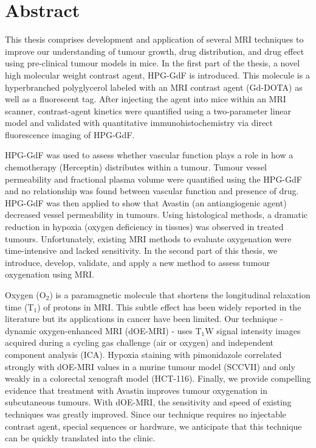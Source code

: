 
\chapter{Abstract}

This thesis comprises development and application of several MRI techniques to improve our understanding of tumour growth, drug distribution, and drug effect using pre-clinical tumour models in mice. In the first part of the thesis, a novel high molecular weight contrast agent, HPG-GdF is introduced. This molecule is a hyperbranched polyglycerol labeled with an MRI contrast agent (Gd-DOTA) as well as a fluorescent tag. After injecting the agent into mice within an MRI scanner, contrast-agent kinetics were quantified using a two-parameter linear model and validated with quantitative immunohistochemistry via direct fluorescence imaging of HPG-GdF.

HPG-GdF was used to assess whether vascular function plays a role in how a chemotherapy (Herceptin) distributes within a tumour. Tumour vessel permeability and fractional plasma volume were quantified using the HPG-GdF and no relationship was found between vascular function and presence of drug. HPG-GdF was then applied to show that Avastin (an antiangiogenic agent) decreased vessel permeability in tumours. Using histological methods, a dramatic reduction in hypoxia (oxygen deficiency in tissues) was observed in treated tumours. Unfortunately, existing MRI methods to evaluate oxygenation were time-intensive and lacked sensitivity. In the second part of this thesis, we introduce, develop, validate, and apply a new method to assess tumour oxygenation using MRI. 

Oxygen (O$_2$) is a paramagnetic molecule that shortens the longitudinal relaxation time (T$_1$) of protons in MRI. This subtle effect has been widely reported in the literature but its applications in cancer have been limited. Our technique - dynamic oxygen-enhanced MRI (\acs{dOE-MRI}) - uses T$_1$W signal intensity images acquired during a cycling gas challenge (air or oxygen) and independent component analysis (ICA). Hypoxia staining with pimonidazole correlated strongly with \acs{dOE-MRI} values in a murine tumour model (SCCVII) and only weakly in a colorectal xenograft model (HCT-116). Finally, we provide compelling evidence that treatment with Avastin improves tumour oxygenation in subcutaneous tumours. With \acs{dOE-MRI}, the sensitivity and speed of existing techniques was greatly improved. Since our technique requires no injectable contrast agent, special sequences or hardware, we anticipate that this technique can be quickly translated into the clinic. 


